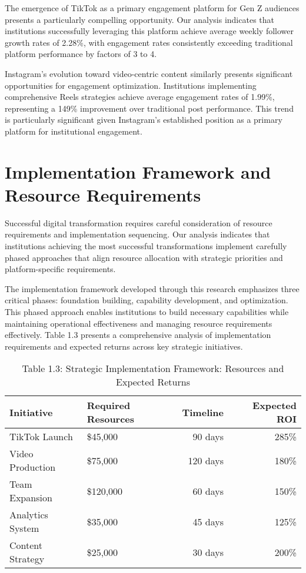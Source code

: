 \documentclass[12pt]{report}
\begin{document}
The emergence of TikTok as a primary engagement platform for Gen Z audiences presents a particularly compelling opportunity. Our analysis indicates that institutions successfully leveraging this platform achieve average weekly follower growth rates of 2.28\%, with engagement rates consistently exceeding traditional platform performance by factors of 3 to 4.

Instagram's evolution toward video-centric content similarly presents significant opportunities for engagement optimization. Institutions implementing comprehensive Reels strategies achieve average engagement rates of 1.99\%, representing a 149\% improvement over traditional post performance. This trend is particularly significant given Instagram's established position as a primary platform for institutional engagement.

\chapter{Implementation Framework and Resource Requirements}

Successful digital transformation requires careful consideration of resource requirements and implementation sequencing. Our analysis indicates that institutions achieving the most successful transformations implement carefully phased approaches that align resource allocation with strategic priorities and platform-specific requirements.

The implementation framework developed through this research emphasizes three critical phases: foundation building, capability development, and optimization. This phased approach enables institutions to build necessary capabilities while maintaining operational effectiveness and managing resource requirements effectively. Table 1.3 presents a comprehensive analysis of implementation requirements and expected returns across key strategic initiatives.

\begin{table}[h]
\centering
\caption{Table 1.3: Strategic Implementation Framework: Resources and Expected Returns}
\begin{tabular}{@{}llrr@{}}
\toprule
\textbf{Initiative} & \textbf{Required Resources} & \textbf{Timeline} & \textbf{Expected ROI} \\
\midrule
TikTok Launch & \$45,000 & 90 days & 285\% \\
Video Production & \$75,000 & 120 days & 180\% \\
Team Expansion & \$120,000 & 60 days & 150\% \\
Analytics System & \$35,000 & 45 days & 125\% \\
Content Strategy & \$25,000 & 30 days & 200\% \\
\bottomrule
\end{tabular}
\end{table}
\end{document}
